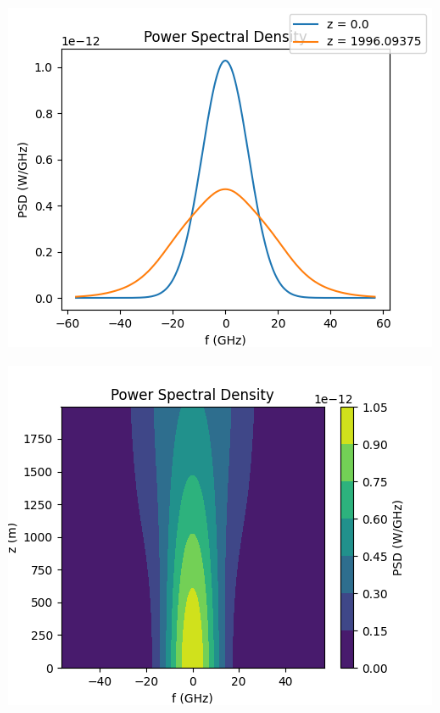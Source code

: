 \documentclass[10pt, a4paper, twocolumn]{article} %
\begin{document}
\begin{figure}%
    \includegraphics[width=\linewidth]{plots/plotFreqPFL.png}
    \caption{}
    \label{trial1FreqPFL}
\end{figure}

\begin{figure}%
    \includegraphics[width=\linewidth]{plots/plotFreqPFL2D.png}
    \caption{}
    \label{trial1FreqPFL2D}
\end{figure} 
\end{document}
